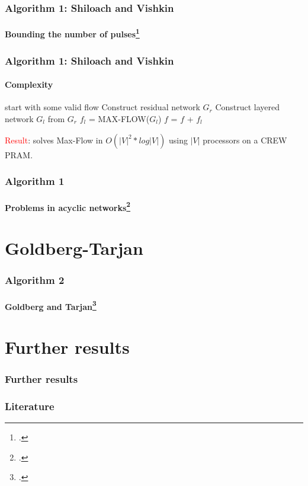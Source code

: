 \documentclass{beamer}
\begin{document}
\begin{frame}
\frametitle{Algorithm 1: Shiloach and Vishkin}
\framesubtitle{Bounding the number of pulses\footcite{vishkin92}} 
\end{frame}

\begin{frame}
\frametitle{Algorithm 1: Shiloach and Vishkin}
\framesubtitle{Complexity} 
	\begin{algorithmic}[1]
	\State start with some valid flow 
	 \Comment{\textcolor{OliveGreen}{$O(\lvert V \rvert)$}}	
		\State Construct residual network $G_r$ \Comment{\textcolor{OliveGreen}{$O(\lvert V \rvert)$, $p=O(\lvert V \rvert)$}}
		\State Construct layered network $G_l$ from $G_r$ 
		\State $f_l$ = MAX-FLOW($G_l$)  \Comment{\textcolor{OliveGreen}{$O(\lvert V \rvert * log \lvert V \rvert)$}}
		\State $f$ = $f$ + $f_l$ \Comment{\textcolor{OliveGreen}{$O(\lvert V \rvert)$}}
	\EndWhile
	\EndFunction
	\end{algorithmic}
	
\pause
\textcolor{red}{Result}: solves Max-Flow in $O({\lvert V \rvert}^{2} * log \lvert V \rvert)$ using $\lvert V \rvert$ processors on a CREW PRAM.
\end{frame}

\begin{frame}
\frametitle{Algorithm 1}
\framesubtitle{Problems in acyclic networks\footcite{vishkin92}} 
\end{frame}

\begin{comment}
Just mention briefly
\end{comment}

\section{Goldberg-Tarjan}
\begin{frame}
\frametitle{Algorithm 2}
\framesubtitle{Goldberg and Tarjan\footcite{goldberg89}} 
\end{frame}
\begin{comment}
Atomic method
proof (?)
\end{comment}

\section{Further results}
\begin{frame}
\frametitle{Further results}
\end{frame}

 	 
\begin{frame}[allowframebreaks]
\frametitle<presentation>{Literature}    
\printbibliography
\end{frame} 	 
\end{document}
